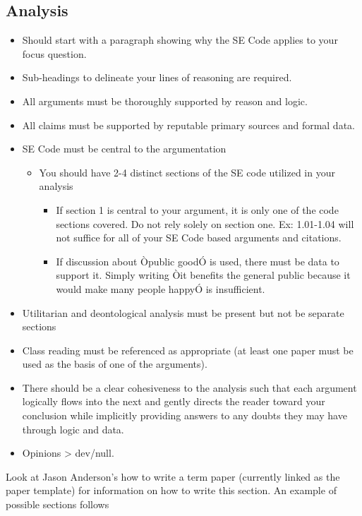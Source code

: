 \documentclass[11pt]{article}
\begin{document}
\begin{multicols}{2}
\section{Analysis}
\begin{itemize}
   \item Should start with a paragraph showing why the SE Code applies to your focus
question.
   \item Sub-headings to delineate your lines of reasoning are required.
   \item All arguments must be thoroughly supported by reason and logic.
   \item All claims must be supported by reputable primary sources and formal data.
   \item SE Code must be central to the argumentation
   \begin{itemize}
      \item You should have 2-4 distinct sections of the SE code utilized in your analysis
      \begin{itemize}
         \item If section 1 is central to your argument, it is only one of the code sections covered. Do not rely solely on section one. Ex: 1.01-1.04 will not suffice for all of your SE Code based arguments and citations.
         \item If discussion about Òpublic goodÓ is used, there must be data to support it. Simply writing Òit benefits the general public because it would make many people happyÓ is insufficient.
      \end{itemize}
   \end{itemize}
   \item Utilitarian and deontological analysis must be present but not be separate sections
   \item Class reading must be referenced as appropriate (at least one paper must be used as the basis of one of the arguments).
   \item There should be a clear cohesiveness to the analysis such that each argument logically flows into the next and gently directs the reader toward your conclusion while implicitly providing answers to any doubts they may have through logic and data.
   \item Opinions > dev/null. \cite{handout}
\end{itemize}

Look at Jason Anderson's how to write a term paper (currently linked as the paper template) for information on how to write this section.  An example of possible sections follows

\end{multicols}
\end{document}

